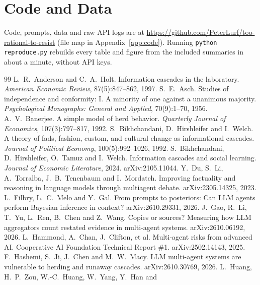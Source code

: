 \documentclass[11pt]{article}
\begin{document}
\section*{Code and Data}
Code, prompts, data and raw API logs are at \url{https://github.com/PeterLurf/too-rational-to-resist} (file map
in Appendix~\ref{app:code}). Running \texttt{python reproduce.py} rebuilds every table and figure from the
included summaries in about a minute, without API keys.
\begin{thebibliography}{99}
 L.~R.~Anderson and C.~A.~Holt. Information cascades
  in the laboratory. \emph{American Economic Review}, 87(5):847--862, 1997.
 S.~E.~Asch. Studies of independence and conformity: I. A minority
  of one against a unanimous majority. \emph{Psychological Monographs: General and Applied}, 70(9):1--70,
  1956.
 A.~V.~Banerjee. A simple model of herd behavior.
  \emph{Quarterly Journal of Economics}, 107(3):797--817, 1992.
 S.~Bikhchandani, D.~Hirshleifer and I.~Welch.
  A theory of fads, fashion, custom, and cultural change as informational cascades. \emph{Journal of
  Political Economy}, 100(5):992--1026, 1992.
 S.~Bikhchandani, D.~Hirshleifer, O.~Tamuz and
  I.~Welch. Information cascades and social learning. \emph{Journal of Economic Literature}, 2024.
  arXiv:2105.11044.
 Y.~Du, S.~Li, A.~Torralba, J.~B.~Tenenbaum and I.~Mordatch.
  Improving factuality and reasoning in language models through multiagent debate. arXiv:2305.14325, 2023.
 L.~Filbry, L.~C.~Melo and Y.~Gal. From prompts to
  posteriors: Can LLM agents perform Bayesian inference in context? arXiv:2610.29331, 2026.
 J.~Gao, R.~Li, T.~Yu, L.~Ren, B.~Chen and Z.~Wang. Copies or
  sources? Measuring how LLM aggregators count restated evidence in multi-agent systems.
  arXiv:2610.06192, 2026.
 L.~Hammond, A.~Chan, J.~Clifton, et al. Multi-agent
  risks from advanced AI. Cooperative AI Foundation Technical Report \#1. arXiv:2502.14143, 2025.
 F.~Hashemi, S.~Ji, J.~Chen and M.~W.~Macy. LLM
  multi-agent systems are vulnerable to herding and runaway cascades. arXiv:2610.30769, 2026.
 L.~Huang, H.~P.~Zou, W.-C.~Huang, W.~Yang, Y.~Han and

\end{thebibliography}
\end{document}
